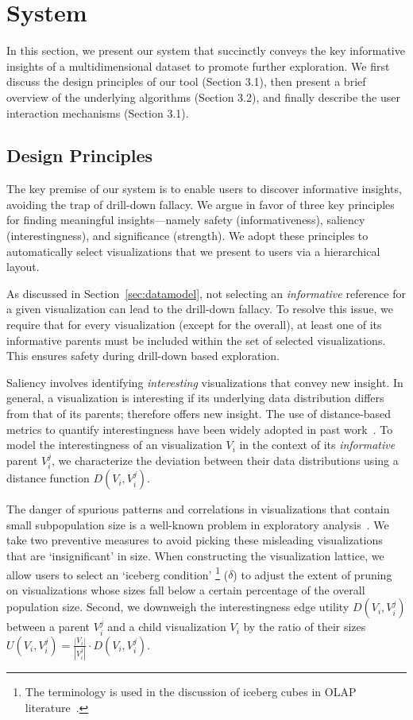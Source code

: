 
\section{System\label{sec:system}}
In this section, we present our system that succinctly conveys the key informative insights of a multidimensional dataset to promote further exploration. We first discuss the design principles of our tool (Section 3.1), then present a brief overview of the underlying algorithms (Section 3.2), and finally describe the user interaction mechanisms (Section 3.1).

\subsection{Design Principles}
The key premise of our system is to enable users to discover informative insights, avoiding the trap of drill-down fallacy. We argue in favor of three key principles for finding meaningful insights---namely safety (informativeness), saliency (interestingness), and significance (strength). We adopt these principles to automatically select visualizations that we present to users via a hierarchical layout.

 As discussed in Section~\ref{sec:datamodel}, not selecting an \emph{informative} reference for a given visualization can lead to the drill-down fallacy. To resolve this issue, we require that for every visualization (except for the overall), at least one of its informative parents must be included within the set of selected visualizations. This ensures safety during drill-down based exploration.

 Saliency involves identifying \textit{interesting} visualizations that convey new insight. In general, a visualization is interesting if its underlying data distribution differs from that of its parents; therefore offers new insight. The use of distance-based metrics to quantify interestingness have been widely adopted in past work~\cite{Vartak2015,Correll2016,Itti2009}. To model the interestingness of an visualization $V_i$ in the context of its \emph{informative} parent $V_i^j$, we characterize the deviation between their data distributions using a distance function $D(V_i, V_i^j)$. 

 The danger of spurious patterns and correlations in visualizations that contain small subpopulation size is a well-known problem in exploratory analysis~\cite{Binnig2017}. We take two preventive measures to avoid picking these misleading visualizations that are `insignificant' in size. When constructing the visualization lattice, we allow users to select an `iceberg condition' \footnote{The terminology is used in the discussion of iceberg cubes in OLAP literature~\cite{Xin2007}.} ($\delta$) to adjust the extent of pruning on visualizations whose sizes fall below a certain percentage of the overall population size. Second, we downweigh the interestingness edge utility $D(V_i, V_i^j)$ between a parent $V_i^j$ and a child visualization $V_i$ by the ratio of their sizes  $U(V_i, V_i^j) = \frac{|V_i|}{|V_i^{j}|} \cdot D(V_i, V_i^j)$.

